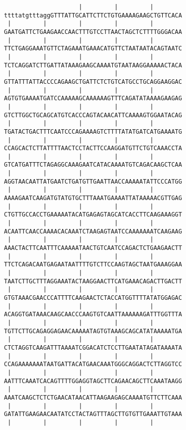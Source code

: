 \documentclass{article}
\begin{document}
\begin{Verbatim}
                     |         |         |        
ttttatgtttaggGTTTATTGCATTCTTCTGTGAAAAGAAGCTGTTCACA
 |         |         |         |         |        
GAATGATTCTGAAGAACCAACTTTGTCCTTAACTAGCTCTTTTGGGACAA
 |         |         |         |         |        
TTCTGAGGAAATGTTCTAGAAATGAAACATGTTCTAATAATACAGTAATC
 |         |         |         |         |        
TCTCAGGATCTTGATTATAAAGAAGCAAAATGTAATAAGGAAAAACTACA
 |         |         |         |         |        
GTTATTTATTACCCCAGAAGCTGATTCTCTGTCATGCCTGCAGGAAGGAC
 |         |         |         |         |        
AGTGTGAAAATGATCCAAAAAGCAAAAAAGTTTCAGATATAAAAGAAGAG
 |         |         |         |         |        
GTCTTGGCTGCAGCATGTCACCCAGTACAACATTCAAAAGTGGAATACAG
 |         |         |         |         |        
TGATACTGACTTTCAATCCCAGAAAAGTCTTTTATATGATCATGAAAATG
 |         |         |         |         |        
CCAGCACTCTTATTTTAACTCCTACTTCCAAGGATGTTCTGTCAAACCTA
 |         |         |         |         |        
GTCATGATTTCTAGAGGCAAAGAATCATACAAAATGTCAGACAAGCTCAA
 |         |         |         |         |        
AGGTAACAATTATGAATCTGATGTTGAATTAACCAAAAATATTCCCATGG
 |         |         |         |         |        
AAAAGAATCAAGATGTATGTGCTTTAAATGAAAATTATAAAAACGTTGAG
 |         |         |         |         |        
CTGTTGCCACCTGAAAAATACATGAGAGTAGCATCACCTTCAAGAAAGGT
 |         |         |         |         |        
ACAATTCAACCAAAACACAAATCTAAGAGTAATCCAAAAAAATCAAGAAG
 |         |         |         |         |        
AAACTACTTCAATTTCAAAAATAACTGTCAATCCAGACTCTGAAGAACTT
 |         |         |         |         |        
TTCTCAGACAATGAGAATAATTTTGTCTTCCAAGTAGCTAATGAAAGGAA
 |         |         |         |         |        
TAATCTTGCTTTAGGAAATACTAAGGAACTTCATGAAACAGACTTGACTT
 |         |         |         |         |        
GTGTAAACGAACCCATTTTCAAGAACTCTACCATGGTTTTATATGGAGAC
 |         |         |         |         |        
ACAGGTGATAAACAAGCAACCCAAGTGTCAATTAAAAAAGATTTGGTTTA
 |         |         |         |         |        
TGTTCTTGCAGAGGAGAACAAAAATAGTGTAAAGCAGCATATAAAAATGA
 |         |         |         |         |        
CTCTAGGTCAAGATTTAAAATCGGACATCTCCTTGAATATAGATAAAATA
 |         |         |         |         |        
CCAGAAAAAAATAATGATTACATGAACAAATGGGCAGGACTCTTAGGTCC
 |         |         |         |         |        
AATTTCAAATCACAGTTTTGGAGGTAGCTTCAGAACAGCTTCAAATAAGG
 |         |         |         |         |        
AAATCAAGCTCTCTGAACATAACATTAAGAAGAGCAAAATGTTCTTCAAA
 |         |         |         |         |        
GATATTGAAGAACAATATCCTACTAGTTTAGCTTGTGTTGAAATTGTAAA
 |         |         |         |         |        

\end{Verbatim}
\end{document}

